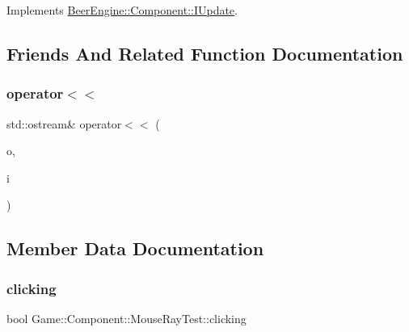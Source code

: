 Implements \mbox{\hyperlink{class_beer_engine_1_1_component_1_1_i_update_aeeda0aa303175720e449b4c51d9867dd}{Beer\+Engine\+::\+Component\+::\+I\+Update}}.



\subsection{Friends And Related Function Documentation}
\mbox{\label{class_game_1_1_component_1_1_mouse_ray_test_a779a38a659ea997f8f091bc720620380}} 
\subsubsection{\texorpdfstring{operator$<$$<$}{operator<<}}
{\footnotesize\ttfamily std\+::ostream\& operator$<$$<$ (\begin{DoxyParamCaption}\item[{std\+::ostream \&}]{o,  }\item[{\mbox{\hyperlink{class_game_1_1_component_1_1_mouse_ray_test}{Mouse\+Ray\+Test}} const \&}]{i }\end{DoxyParamCaption})\hspace{0.3cm}{\ttfamily [friend]}}



\subsection{Member Data Documentation}
\mbox{\label{class_game_1_1_component_1_1_mouse_ray_test_a526049c590ec69e6dcdbf127aaa0a244}} 
\subsubsection{\texorpdfstring{clicking}{clicking}}
{\footnotesize\ttfamily bool Game\+::\+Component\+::\+Mouse\+Ray\+Test\+::clicking}

